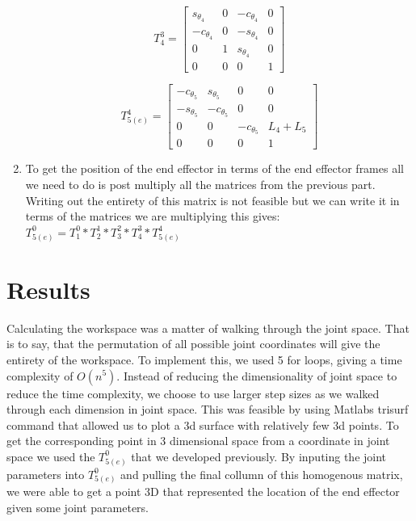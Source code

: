 \documentclass[12pt]{article}
\begin{document}
\begin{enumerate}
\begin{equation}	
	T^{3}_{4} = \begin{bmatrix}
	s_{\theta_{4}} & 0  & -c_{\theta_{4}}  &0\\
	-c_{\theta_{4}}  & 0  & -s_{\theta_{4}} & 0\\
	0 & 1 & s_{\theta_{4}}  & 0\\
	0 & 0 & 0 & 1
	\end{bmatrix}
\end{equation}

\begin{equation}	
	T^{4}_{5(e)} = \begin{bmatrix}
	-c_{\theta_{5}} & s_{\theta_{5}}   & 0  &0\\
	-s_{\theta_{5}} & -c_{\theta_{5}}  & 0 & 0\\
	0 & 0 & -c_{\theta_{5}} & L_{4}+L_{5}\\
	0 & 0 & 0 & 1
	\end{bmatrix}
\end{equation}

\item 

To get the position of the end effector in terms of the end effector frames all we need to do is post multiply all the matrices from the previous part. Writing out the entirety of this matrix is not feasible but we can write it in terms of the matrices we are multiplying this gives:
$T^{0}_{5(e)} =T^{0}_{1}*T^{1}_{2}*T^{2}_{3}*T^{3}_{4}*T^{4}_{5(e)}$
\end{enumerate}
 
\section{Results}
\par{Calculating the workspace was a matter of walking through the joint space. That is to say, that the permutation of all possible joint coordinates will give the entirety of the workspace. To implement this, we used 5 for loops, giving a time complexity of $O(n^{5})$. Instead of reducing the dimensionality of joint space to reduce the time complexity, we choose to use larger step sizes as we walked through each dimension in joint space. This was feasible by using Matlabs trisurf command that allowed us to plot a 3d surface with relatively few 3d points. To get the corresponding point in 3 dimensional space from a coordinate in joint space we used the $T^{0}_{5(e)} $ that we developed previously.  By inputing the joint parameters into $T^{0}_{5(e)}$ and pulling the final collumn of this homogenous matrix, we were able to get a point 3D that represented the location of the end effector given some joint parameters.}
\end{document}
